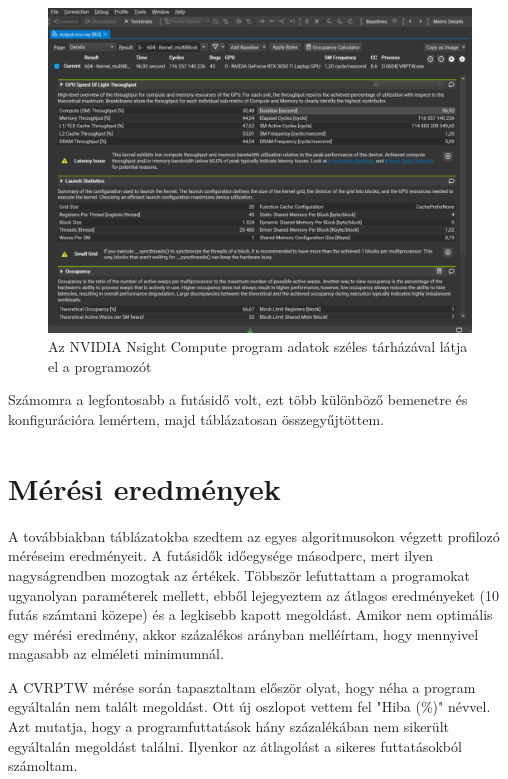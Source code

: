 \begin{figure}[ht!]
	\centering
	\includegraphics[width=125mm, keepaspectratio]{figures/nsight-compute2.png}
	\caption{Az NVIDIA Nsight Compute program adatok széles tárházával látja el a programozót }
	\label{fig:nsight-compute}
\end{figure}




Számomra a legfontosabb a futásidő volt, ezt több különböző bemenetre és konfigurációra lemértem, majd táblázatosan összegyűjtöttem.

\section{Mérési eredmények}

A továbbiakban táblázatokba szedtem az egyes algoritmusokon végzett profilozó méréseim eredményeit. A futásidők időegysége másodperc, mert ilyen nagyságrendben mozogtak az értékek. Többször lefuttattam a programokat ugyanolyan paraméterek mellett, ebből lejegyeztem az átlagos eredményeket (10 futás számtani közepe) és a legkisebb kapott megoldást. Amikor nem optimális egy mérési eredmény, akkor százalékos arányban melléírtam, hogy mennyivel magasabb az elméleti minimumnál.

A CVRPTW mérése során tapasztaltam először olyat, hogy néha a program egyáltalán nem talált megoldást. Ott új oszlopot vettem fel "Hiba (\%)" névvel. Azt mutatja, hogy a programfuttatások hány százalékában nem sikerült egyáltalán megoldást találni. Ilyenkor az átlagolást a sikeres futtatásokból számoltam.

\newpage
\newpage

